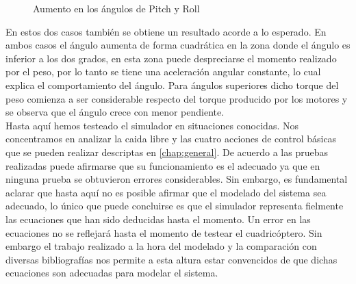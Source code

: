 \documentclass[main]{subfiles}
\begin{document}
\begin{figure} 
  \centering
  \caption{Aumento en los \'angulos de Pitch y Roll}
  \label{fig:giros}
\end{figure}

En estos dos casos tambi\'en se obtiene un resultado acorde a lo esperado. En ambos casos el \'angulo aumenta de forma cuadr\'atica en la zona donde el \'angulo es inferior a los dos grados, en esta zona puede despreciarse el momento realizado por el peso, por lo tanto se tiene una aceleraci\'on angular constante, lo cual explica el comportamiento del \'angulo. Para \'angulos superiores dicho torque del peso comienza a ser considerable respecto del torque producido por los motores y se observa que el \'angulo crece con menor pendiente.\\

Hasta aqu\'i hemos testeado el simulador en situaciones conocidas. Nos concentramos en analizar la caida libre y las cuatro acciones de control b\'asicas que se pueden realizar descriptas en \ref{chap:general}. De acuerdo a las pruebas realizadas puede afirmarse que su funcionamiento es el adecuado ya que en ninguna prueba se obtuvieron errores considerables. Sin embargo, es fundamental aclarar que hasta aqu\'i no es posible afirmar que el modelado del sistema sea adecuado, lo \'unico que puede concluirse es que el simulador representa fielmente las ecuaciones que han sido deducidas hasta el momento. Un error en las ecuaciones no se reflejar\'a hasta el momento de testear el cuadric\'optero. Sin embargo el trabajo realizado a la hora del modelado y la comparaci\'on con diversas bibliograf\'ias nos permite a esta altura estar convencidos de que dichas ecuaciones son adecuadas para modelar el sistema.
\end{document}

